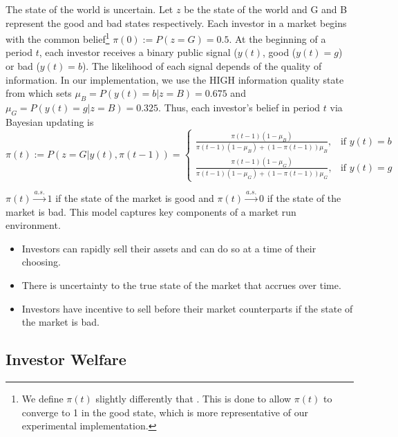 \documentclass[11pt]{article}
\begin{document}
The state of the world is uncertain. Let $z$ be the state of the world and G and B represent the good and bad states respectively. Each investor in a market begins with the common belief\footnote{We define $\pi(t)$ slightly differently that \cite{magnani2020dynamic}. This is done to allow $\pi(t)$ to converge to 1 in the good state, which is more representative of our experimental implementation.}  $\pi(0) := P(z = G) = 0.5$. At the beginning of a period $t$, each investor receives a binary public signal ($y(t)$, good ($y(t) = g$) or bad ($y(t) = b$). The likelihood of each signal depends of the quality of information. In our implementation, we use the HIGH information quality state from \cite{magnani2020dynamic} which sets $\mu_B = P(y(t) = b | z = B) = 0.675$ and $\mu_G = P(y(t) = g | z = B) = 0.325$. Thus, each investor's belief in period $t$ via Bayesian updating is
\begin{equation}
    \pi(t) := P(z = G|y(t), \pi(t-1)) =
    \begin{cases}
        \frac{\pi(t-1)(1-\mu_B)}{\pi(t-1)(1-\mu_B) + (1-\pi(t-1))\mu_B}, & \text{if   } y(t) = b \\
        \frac{\pi(t-1)(1-\mu_G)}{\pi(t-1)(1-\mu_G) + (1-\pi(t-1))\mu_G}, & \text{if   } y(t) = g
    \end{cases}
    \label{eq:bayes}
\end{equation}

$\pi(t) \overset{a.s.}{\to} 1$ if the state of the market is good and $\pi(t) \overset{a.s.}{\to} 0 $ if the state of the market is bad.
This model captures key components of a market run environment.
\begin{itemize}
    \item Investors can rapidly sell their assets and can do so at a time of their choosing.
    \item There is uncertainty to the true state of the market that accrues over time.
    \item Investors have incentive to sell before their market counterparts if the state of the market is bad.
\end{itemize}

\subsection{Investor Welfare}
\end{document}
